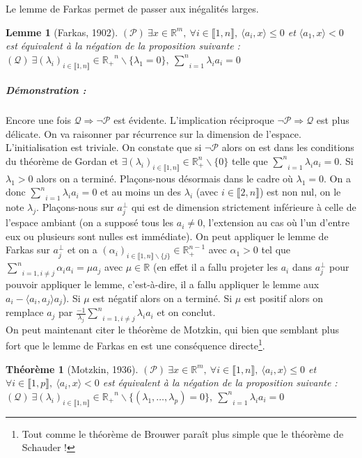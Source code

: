 \documentclass[10pt,a4paper]{article}
\newtheorem{thm}{Théorème}
\newtheorem{lemma}{Lemme}
\begin{document}
Le lemme de Farkas permet de passer aux inégalités larges.
\begin{lemma}[Farkas, 1902]
  $(\mathcal{P}) \  \exists x \in \mathbb{R}^m, \ \forall i \in \llbracket 1,n \rrbracket, \ \langle a_i,x \rangle \le 0$ et $\langle a_1,x \rangle < 0$ est équivalent à la négation de la proposition suivante : $ (\mathcal{Q}) \ \exists (\lambda_i)_{i \in \llbracket 1,n \rrbracket}\in \mathbb{R_+}^n \backslash\lbrace \lambda_1=0\rbrace, \ \underset{i=1}{\overset{n}{\sum}} \lambda_i a_i=0$
\end{lemma}
\subparagraph{Démonstration :} Encore une fois $\mathcal{Q} \Rightarrow \neg \mathcal{P}$ est évidente.
L'implication réciproque $\neg \mathcal{P} \Rightarrow \mathcal{Q}$ est plus délicate.
On va raisonner par récurrence sur la dimension de l'espace.
L'initialisation est triviale.
On constate que si $\neg \mathcal{P}$ alors on est dans les conditions du théorème de Gordan et $\exists (\lambda_i)_{i \in \llbracket 1, n\rrbracket} \in \mathbb{R}_+^n \backslash \lbrace 0 \rbrace$ telle que $\underset{i=1}{\overset{n}{\sum}} \lambda_i a_i=0$.
Si  $\lambda_1 >0$ alors on a terminé.
Plaçons-nous désormais dans le cadre où $\lambda_1=0$.
On a donc $\underset{i=1}{\overset{n}{\sum}} \lambda_i a_i=0$ et au moins un des $\lambda_i$ (avec $i \in \llbracket 2,n \rrbracket$) est non nul, on le note $\lambda_j$.
Plaçons-nous sur $a_j^{\perp}$ qui est de dimension strictement inférieure à celle de l'espace ambiant (on a supposé tous les $a_i \neq 0$, l'extension au cas où l'un d'entre eux ou plusieurs sont nulles est immédiate).
On peut appliquer le lemme de Farkas sur $a_j^{\perp}$ et on a $(\alpha_i)_{i \in \llbracket 1,n \rrbracket \backslash \lbrace j \rbrace} \in \mathbb{R}_+^{n-1}$ avec $\alpha_1>0$ tel que $\underset{i=1, i \neq j}{\overset{n}{\sum}}\alpha_i a_i= \mu a_j$ avec $\mu \in \mathbb{R}$ (en effet il a fallu projeter les $a_i$ dans $a_j^{\perp}$ pour pouvoir appliquer le lemme, c'est-à-dire, il a fallu appliquer le lemme aux $a_i-\langle a_i,a_j \rangle a_j$).
Si $\mu$ est négatif alors on a terminé.
Si $\mu$ est positif alors on remplace $a_j$ par $\frac{-1}{\lambda_j}\underset{i=1, i \neq j}{\overset{n}{\sum}}\lambda_i a_i$ et on conclut.
\\

On peut maintenant citer le théorème de Motzkin, qui bien que semblant plus fort que le lemme de Farkas en est une conséquence directe\footnote{Tout comme le théorème de Brouwer paraît plus simple que le théorème de Schauder !}.

\begin{thm}[Motzkin, 1936]
  $(\mathcal{P}) \  \exists x \in \mathbb{R}^m, \ \forall i \in \llbracket 1,n \rrbracket, \ \langle a_i,x \rangle \le 0$ et $\forall i \in \llbracket 1,p \rrbracket, \ \langle a_i,x \rangle < 0$
  est équivalent à la négation de la proposition suivante :
  $ (\mathcal{Q}) \ \exists (\lambda_i)_{i \in \llbracket 1,n \rrbracket}\in \mathbb{R_+}^n \backslash\lbrace (\lambda_1,\dots,\lambda_p)=0\rbrace, \ \underset{i=1}{\overset{n}{\sum}} \lambda_i a_i=0$
\end{thm}
\end{document}
